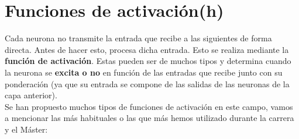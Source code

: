 \documentclass[11pt,fleqn]{book} %
\begin{document}
\section{Funciones de activación(h)}\label{sec:activacion}

Cada neurona no transmite la entrada que recibe a las siguientes de forma directa. Antes de hacer esto, procesa dicha entrada. Esto se realiza mediante la \textbf{función de activación}. Estas pueden ser de muchos tipos y determina cuando la neurona se \textbf{excita o no} en función de las entradas que recibe junto con su ponderación (ya que su entrada se compone de las salidas de las neuronas de la capa anterior)\cite{article:redNeuronal2}. \\

Se han propuesto muchos tipos de funciones de activación en este campo, vamos a mencionar las más habituales o las que más hemos utilizado durante la carrera y el Máster: \\
\end{document}
